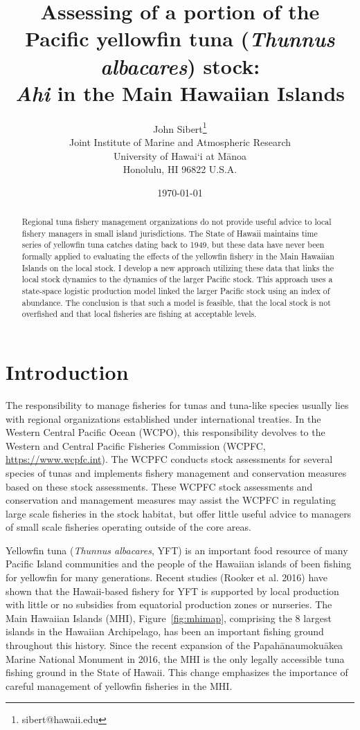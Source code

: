 \documentclass[12pt,letterpaper]{article}
\title{Assessing of a portion of the Pacific yellowfin tuna 
({\it Thunnus albacares}) stock:\\[0.125in]
{\it Ahi} in the Main Hawaiian Islands}
\author{
John Sibert\thanks{sibert@hawaii.edu}\\
Joint Institute of Marine and Atmospheric Research\\
University of Hawai`i at M\={a}noa\\
Honolulu, HI  96822 U.S.A.\\[0.125in]
\date{\today}
}
\newcommand\doublespacing{\baselineskip=1.6\normalbaselineskip}
\begin{document}
\maketitle


\begin{abstract}
Regional tuna fishery management organizations do not provide useful
advice to local fishery managers in small island jurisdictions. The
State of Hawaii maintains time series of yellowfin tuna catches dating
back to 1949, but these data have never been formally applied to
evaluating the effects of the yellowfin fishery in the Main Hawaiian
Islands on the local stock. I develop a new approach utilizing these
data that links the local stock dynamics to the dynamics of the larger
Pacific stock. This approach uses a state-space logistic production
model linked the larger Pacific stock using an index of abundance. The
conclusion is that such a model is feasible, that the local stock
is not overfished and that local fisheries are fishing at acceptable
levels.
\end{abstract}


\section*{Introduction}
The responsibility to manage fisheries for tunas and tuna-like
species usually
lies with regional organizations established under international treaties.
In the Western Central Pacific Ocean (WCPO), this responsibility devolves to
the Western and Central Pacific Fisheries Commission (WCPFC, 
\url{https://www.wcpfc.int}).
The WCPFC conducts stock assessments for several species of tunas and
implements fishery management and conservation measures based on
these stock assessments. 
These WCPFC stock assessments and conservation and management measures
may assist the WCPFC in regulating large scale fisheries in the stock
habitat, but offer little useful advice to managers of small scale
fisheries operating outside of the core areas.

Yellowfin tuna ({\it Thunnus albacares}, YFT) is an important food resource
of many Pacific Island communities and the people of the Hawaiian
islands of been fishing for yellowfin for many generations. 
Recent studies (Rooker et al. 2016) have shown that the Hawaii-based
fishery for YFT is  supported by
local production with little or no subsidies from equatorial
production zones or nurseries.
The Main Hawaiian Islands (MHI), Figure~\ref{fig:mhimap},
comprising the 8 largest islands in the Hawaiian Archipelago,
has been an important fishing ground throughout this history.
Since the recent expansion of the Papah\={a}naumoku\={a}kea Marine National
Monument in 2016, the MHI is the only legally accessible tuna fishing ground
in the State of Hawaii.
This change emphasizes the importance of careful management of yellowfin
fisheries in the MHI.
\end{document}
